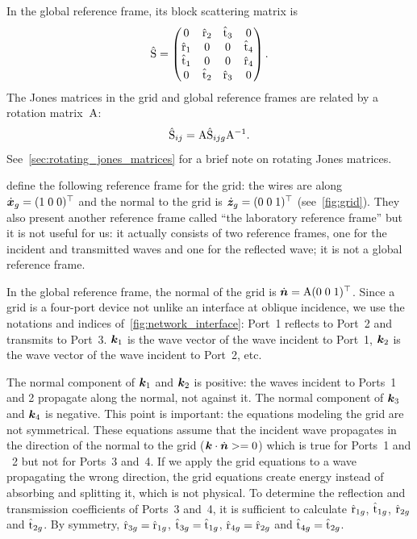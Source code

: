 In the global reference frame, its block scattering matrix is
\begin{equation}
    \hat{\mathrm{S}}
    =
    \begin{pmatrix}
        0              & \hat{\mathrm{r}}_{2} & \hat{\mathrm{t}}_{3} & 0               \\
        \hat{\mathrm{r}}_{1} & 0              & 0              & \hat{\mathrm{t}}_{4} \\
        \hat{\mathrm{t}}_{1} & 0              & 0              & \hat{\mathrm{r}}_{4} \\
        0              & \hat{\mathrm{t}}_{2} & \hat{\mathrm{r}}_{3} & 0
    \end{pmatrix}
    \text{.}
    \label{eq:grid_scattering_global}
\end{equation}
The Jones matrices in the grid and global reference frames are related by a rotation matrix~$\mathrm{A}$:
\begin{equation}
    \hat{\mathrm{S}}_{ij} = \mathrm{A} \hat{\mathrm{S}}_{ijg} \mathrm{A}^{-1}
    \text{.}
    \label{eq:grid_rotation}
\end{equation}
See~\cref{sec:rotating_jones_matrices} for a brief note on rotating Jones matrices.

\citeauthor{houde_2001} define the following reference frame for the grid: the wires are along $\dot{\bm{x}}_g=(1 \; 0 \; 0)^\top$ and the normal to the grid is $\dot{\bm{z}}_g=(0 \; 0 \; 1)^\top$ (see~\cref{fig:grid}).
They also present another reference frame called ``the laboratory reference frame'' but it is not useful for us:
it actually consists of two reference frames, one for the incident and transmitted waves and one for the reflected wave; it is not a global reference frame.

In the global reference frame,
the normal of the grid is $\dot{\bm{n}} = \mathrm{A} (0 \; 0 \; 1)^\top$.
Since a grid is a four-port device not unlike an interface at oblique incidence, we use the notations and indices of~\cref{fig:network_interface}:
Port~1 reflects to Port~2 and transmits to Port~3.
$\bm{k}_1$ is the wave vector of the wave incident to Port~1,
$\bm{k}_2$ is the wave vector of the wave incident to Port~2, etc.

The normal component of $\bm{k}_1$ and $\bm{k}_2$ is positive: the waves incident to Ports~1 and 2 propagate along the normal, not against it.
The normal component of $\bm{k}_3$ and $\bm{k}_4$ is negative.
This point is important: the equations modeling the grid are not symmetrical.
These equations assume that the incident wave propagates in the direction of the normal to the grid ($\bm{k} \cdot \dot{\bm{n}} >= 0$)
which is true for Ports~1 and ~2 but not for Ports~3 and~4.
If we apply the grid equations to a wave propagating the wrong direction, the grid equations create energy instead of absorbing and splitting it, which is not physical.
To determine the reflection and transmission coefficients of Ports~3 and~4,
it is sufficient to calculate
$\hat{\mathrm{r}}_{1g}$, $\hat{\mathrm{t}}_{1g}$, $\hat{\mathrm{r}}_{2g}$ and $\hat{\mathrm{t}}_{2g}$.
By symmetry,
$\hat{\mathrm{r}}_{3g}=\hat{\mathrm{r}}_{1g}$,
$\hat{\mathrm{t}}_{3g}=\hat{\mathrm{t}}_{1g}$,
$\hat{\mathrm{r}}_{4g}=\hat{\mathrm{r}}_{2g}$ and
$\hat{\mathrm{t}}_{4g}=\hat{\mathrm{t}}_{2g}$.

